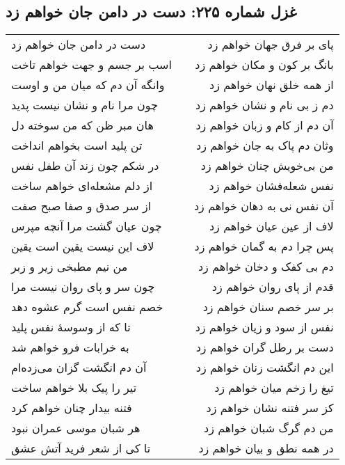 \begin{center}
\section*{غزل شماره ۲۲۵: دست در دامن جان خواهم زد}
\label{sec:225}
\begin{longtable}{l p{0.5cm} r}
دست در دامن جان خواهم زد
&&
پای بر فرق جهان خواهم زد
\\
اسب بر جسم و جهت خواهم تاخت
&&
بانگ بر کون و مکان خواهم زد
\\
وانگه آن دم که میان من و اوست
&&
از همه خلق نهان خواهم زد
\\
چون مرا نام و نشان نیست پدید
&&
دم ز بی نام و نشان خواهم زد
\\
هان مبر ظن که من سوخته دل
&&
آن دم از کام و زبان خواهم زد
\\
تن پلید است بخواهم انداخت
&&
وثان دم پاک به جان خواهم زد
\\
در شکم چون زند آن طفل نفس
&&
من بی‌خویش چنان خواهم زد
\\
از دلم مشعله‌ای خواهم ساخت
&&
نفس شعله‌فشان خواهم زد
\\
از سر صدق و صفا صبح صفت
&&
آن نفس نی به دهان خواهم زد
\\
چون عیان گشت مرا آنچه مپرس
&&
لاف از عین عیان خواهم زد
\\
لاف این نیست یقین است یقین
&&
پس چرا دم به گمان خواهم زد
\\
من نیم مطبخی زیر و زبر
&&
دم بی کفک و دخان خواهم زد
\\
چون سر و پای روان نیست مرا
&&
قدم از پای روان خواهم زد
\\
خصم نفس است گرم عشوه دهد
&&
بر سر خصم سنان خواهم زد
\\
تا که از وسوسهٔ نفس پلید
&&
نفس از سود و زیان خواهم زد
\\
به خرابات فرو خواهم شد
&&
دست بر رطل گران خواهم زد
\\
آن دم انگشت گزان می‌زده‌ام
&&
این دم انگشت زنان خواهم زد
\\
تیر را پیک بلا خواهم ساخت
&&
تیغ را زخم میان خواهم زد
\\
فتنه بیدار چنان خواهم کرد
&&
کز سر فتنه نشان خواهم زد
\\
هر شبان موسی عمران نبود
&&
من دم گرگ شبان خواهم زد
\\
تا کی از شعر فرید آتش عشق
&&
در همه نطق و بیان خواهم زد
\\
\end{longtable}
\end{center}
